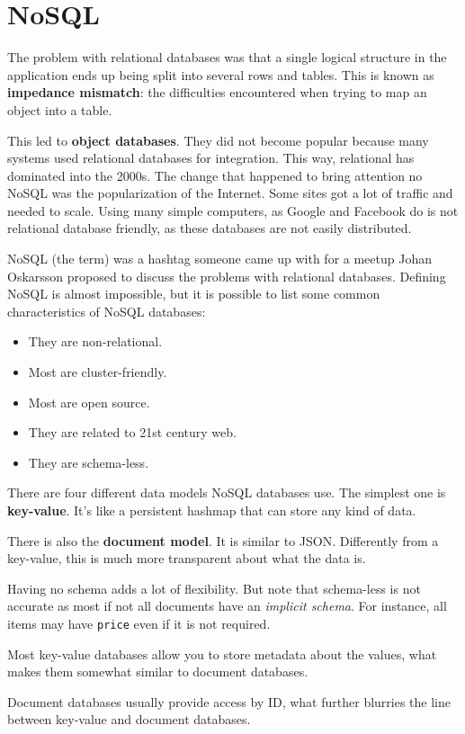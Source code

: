 \documentclass[oneside]{book} %
\theoremstyle{plain}
\begin{document}
\section{NoSQL}
The problem with relational databases was that a single logical structure in the
application ends up being split into several rows and tables. This is known as
\textbf{impedance mismatch}: the difficulties encountered when trying to map
an object into a table.

This led to \textbf{object databases}. They did not become popular because many
systems used relational databases for integration. This way, relational has
dominated into the 2000s. The change that happened to bring attention no NoSQL
was the popularization of the Internet. Some sites got a lot of traffic and
needed to scale. Using many simple computers, as Google and Facebook do is not
relational database friendly, as these databases are not easily distributed.

NoSQL (the term) was a hashtag someone came up with for a meetup Johan
Oskarsson proposed to discuss the problems with relational databases. Defining
NoSQL is almost impossible, but it is possible to list some common
characteristics of NoSQL databases:
\begin{itemize}
 \item They are non-relational.
 \item Most are cluster-friendly.
 \item Most are open source.
 \item They are related to 21st century web.
 \item They are schema-less.
\end{itemize}

There are four different data models NoSQL databases use.
The simplest one is \textbf{key-value}. It's like a persistent hashmap that can
store any kind of data.

There is also the \textbf{document model}. It is similar to JSON. Differently
from a key-value, this is much more transparent about what the data is.

Having no schema adds a lot of flexibility. But note that schema-less is not
accurate as most if not all documents have an \textit{implicit schema}. For
instance, all items may have \texttt{price} even if it is not required.

Most key-value databases allow you to store metadata about the values, what
makes them somewhat similar to document databases.

Document databases usually provide access by ID, what further blurries the line
between key-value and document databases.
\end{document}
